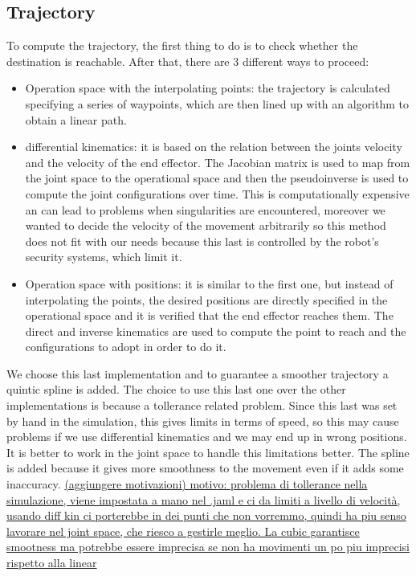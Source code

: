 \documentclass[12pt,a4paper]{article}
\begin{document}
\subsection{Trajectory}\label{subsec:trajectory}
To compute the trajectory, the first thing to do is to check whether the destination is reachable. After that, there are 3 different ways to proceed:
\begin{itemize}
    \item Operation space with the interpolating points: the trajectory is calculated specifying a series of waypoints, which are then lined up with an algorithm to obtain a linear path.
    \item differential kinematics: it is based on the relation between the joints velocity and the velocity of the end effector. The Jacobian matrix is used to map from the joint space to the operational space and then the pseudoinverse is used to compute the joint configurations over time. This is computationally expensive an can lead to problems when singularities are encountered, moreover we wanted to decide the velocity of the movement arbitrarily so this method does not fit with our needs because this last is controlled by the robot's security systems, which limit it.
    \item Operation space with positions: it is similar to the first one, but instead of interpolating the points, the desired positions are directly specified in the operational space and it is verified that the end effector reaches them. The direct and inverse kinematics are used to compute the point to reach and the configurations to adopt in order to do it. 
\end{itemize}    
We choose this last implementation and to guarantee a smoother trajectory a quintic spline is added. The choice to use this last one over the other implementations is because a tollerance related problem. Since this last was set by hand in the simulation, this gives limits in terms of speed, so this may cause problems if we use differential kinematics and we may end up in wrong positions. It is better to work in the joint space to handle this limitations better. The spline is added because it gives more smoothness to the movement even if it adds some inaccuracy.
\uline{(aggiungere motivazioni)
motivo: problema di tollerance nella simulazione, viene impostata a mano nel .jaml e ci da limiti a livello di velocità, usando diff kin ci porterebbe in dei punti che non vorremmo, quindi ha piu senso lavorare nel joint space, che riesco a gestirle meglio. 
La cubic garantisce smootness ma potrebbe essere imprecisa se non ha movimenti un po piu imprecisi rispetto alla linear}
\end{document}
